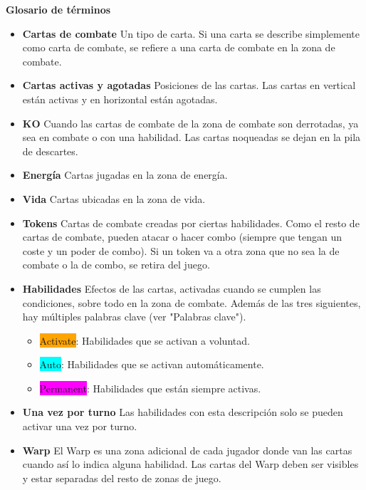 \documentclass[10pt,a4paper]{article}
\begin{document}
\begin{shaded}
  \textbf{Glosario de términos}
  \begin{itemize}
    \item \textbf{Cartas de combate} \newline
    Un tipo de carta. Si una carta se describe simplemente como carta de combate, se refiere a una carta de combate en la zona de combate.
    \item \textbf{Cartas activas y agotadas} \newline
    Posiciones de las cartas. Las cartas en vertical están activas y en horizontal están agotadas.
    \item \textbf{KO} \newline
    Cuando las cartas de combate de la zona de combate son derrotadas, ya sea en combate o con una habilidad. Las cartas noqueadas se dejan en la pila de descartes.
    \item \textbf{Energía} \newline
    Cartas jugadas en la zona de energía.
    \item \textbf{Vida} \newline
    Cartas ubicadas en la zona de vida.
    \item \textbf{Tokens} \newline
    Cartas de combate creadas por ciertas habilidades. Como el resto de cartas de combate, pueden atacar o hacer combo (siempre que tengan un coste y un poder de combo).
    Si un token va a otra zona que no sea la de combate o la de combo, se retira del juego.
    \item \textbf{Habilidades} \newline
    Efectos de las cartas, activadas cuando se cumplen las condiciones, sobre todo en la zona de combate.
    Además de las tres siguientes, hay múltiples palabras clave (ver "Palabras clave").
    \begin{itemize}
      \item \colorbox{orange}{\color{white}Activate}: Habilidades que se activan a voluntad.
      \item \colorbox{cyan}{\color{white}Auto}: Habilidades que se activan automáticamente.
      \item \colorbox{magenta}{\color{white}Permanent}: Habilidades que están siempre activas.
    \end{itemize}
    \item \textbf{Una vez por turno} \newline
    Las habilidades con esta descripción solo se pueden activar una vez por turno.
    \item \textbf{Warp} \newline
    El Warp es una zona adicional de cada jugador donde van las cartas cuando así lo indica alguna habilidad.
    Las cartas del Warp deben ser visibles y estar separadas del resto de zonas de juego.
  \end{itemize}
\end{shaded}
\end{document}
